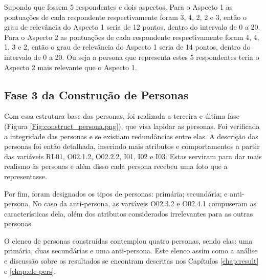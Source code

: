 Supondo que fossem 5 respondentes e dois aspectos. Para o Aspecto 1 as pontuações de cada respondente respectivamente foram 3, 4, 2, 2 e 3, então o grau de relevância do Aspecto 1 seria de 12 pontos, dentro do intervalo de 0 a 20. Para o Aspecto 2 as pontuações de cada respondente respectivamente foram 4, 4, 1, 3 e 2, então o grau de relevância do Aspecto 1 seria de 14 pontos, dentro do intervalo de 0 a 20. Ou seja a persona que representa estes 5 respondentes teria o Aspecto 2 mais relevante que o Aspecto 1. 

\subsection{Fase 3 da Construção de Personas}

Com essa estrutura base das personas, foi realizada a terceira e última fase (Figura \ref{Fig:construct_persona.png}), que visa lapidar as personas. Foi verificada a integridade das personas e se existiam redundâncias entre elas. A descrição das personas foi então detalhada, inserindo mais atributos e comportamentos a partir das variáveis RL01, O02.1.2, O02.2.2, I01, I02 e I03. Estas serviram para dar mais realismo às personas e além disso cada persona recebeu uma foto que a representasse. 

Por fim, foram designados os tipos de personas: primária; secundária; e anti-persona. No caso da anti-persona, as variáveis O02.3.2 e O02.4.1 compuseram as características dela, além dos atributos considerados irrelevantes para as outras personas.

O elenco de personas construídas contemplou quatro personas, sendo elas: uma primária, duas secundárias e uma anti-persona. Este elenco assim como a análise e discussão sobre os resultados se encontram descritas nos Capítulos \ref{chap:result} e \ref{chap:ele-pers}.
